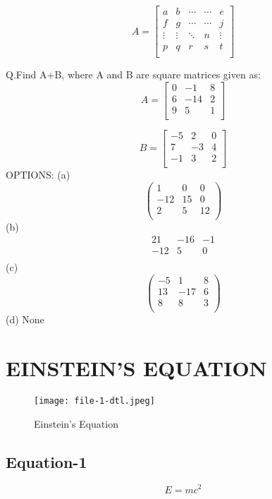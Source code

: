 \documentclass{article}
\begin{document}
\[A=
\begin{bmatrix}
	a & b & \cdots & \cdots & e\\
	f & g & \cdots & \cdots & j\\
	\vdots & \vdots & \ddots & n & \vdots\\
	p & q & r & s & t\\
\end{bmatrix}
\]

Q.Find A+B, where A and B are square matrices given as:\cite{3}
\[A=
\begin{bmatrix}
        0 & -1 & 8\\
        6 & -14 & 2\\
        9 & 5 & 1\\
\end{bmatrix}
\]


\[B=
\begin{bmatrix}
	-5 & 2 & 0\\
	7 & -3 & 4\\
	-1 & 3 &2\\
\end{bmatrix}
\]
OPTIONS:
(a) 
\[
	\begin{pmatrix}
		1 & 0 & 0\\
		-12 & 15 & 0\\
		2 & 5 & 12\\
	\end{pmatrix}
\]
(b)
\[
        \begin{matrix}
		21 & -16 & -1\\
		-12 & 5 & 0\\  
        \end{matrix}
\]
(c)
\[
        \begin{pmatrix}
		-5 & 1 & 8\\
		13 & -17 & 6\\
		8 & 8 & 3\\
        \end{pmatrix}
\]
(d) None
\section{EINSTEIN'S EQUATION}

\begin{figure}
\texttt{[image: file-1-dtl.jpeg]}
\caption{Einstein's Equation}
\label{fig:Einstein's Equation}
\end{figure}

\subsection{Equation-1}
\begin{equation}
	E=mc^2
\end{equation}
\end{document}
